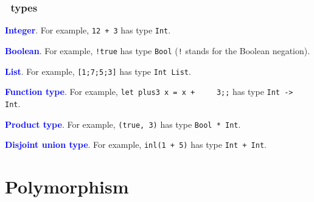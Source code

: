 \documentclass[12pt,red]{beamer}
\newcommand{\cemph}[1]{\textcolor{blue}{\textbf{#1}}}
\begin{document}
\begin{frame}
  \frametitle{\ML\ types}

  \cemph{Integer}.  For example, \lstinline{12 + 3} has type
  \lstinline{Int}.

  \vspace{0.1in}

  \cemph{Boolean}.  For example, \lstinline{!true} has type
  \lstinline{Bool} (\lstinline{!} stands for the Boolean negation).

  \vspace{0.1in}

  \cemph{List}.  For example, \lstinline{[1;7;5;3]} has type
  \lstinline{Int List}.

  \vspace{0.1in}

  \cemph{Function type}.  For example, \lstinline{let plus3 x = x +
    3;;} has type \lstinline{Int -> Int}.

  \vspace{0.1in}

  \cemph{Product type}.  For example, \lstinline{(true, 3)} has
  type \lstinline{Bool * Int}.

  \vspace{0.1in}

  \cemph{Disjoint union type}.  For example, \lstinline{inl(1 + 5)}
  has type \lstinline{Int + Int}.

\end{frame}


\section{Polymorphism}
\end{document}
